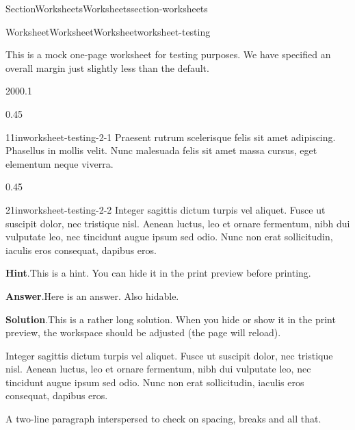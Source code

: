 \documentclass[oneside,10pt,]{article}
\newcommand{\blocktitlefont}{\relax}
\numberwithin{equation}{section}
\begin{document}
\begin{sectionptx}{Section}{Worksheets}{}{Worksheets}{}{}{section-worksheets}
%
\begin{worksheet-subsection}{Worksheet}{Worksheet}{}{Worksheet}{}{}{worksheet-testing}
\begin{introduction}{}%
This is a mock one-page worksheet for testing purposes. We have specified an overall margin just slightly less than the default.%
\end{introduction}%
\begin{sidebyside}{2}{0}{0}{0.1}%
\begin{sbspanel}{0.45}%
\begin{divisionexercise}{1}{}{1in}{worksheet-testing-2-1}%
Praesent rutrum scelerisque felis sit amet adipiscing. Phasellus in mollis velit. Nunc malesuada felis sit amet massa cursus, eget elementum neque viverra.%
\end{divisionexercise}%
\end{sbspanel}%
\begin{sbspanel}{0.45}%
\begin{divisionexercise}{2}{}{1in}{worksheet-testing-2-2}%
Integer sagittis dictum turpis vel aliquet. Fusce ut suscipit dolor, nec tristique nisl. Aenean luctus, leo et ornare fermentum, nibh dui vulputate leo, nec tincidunt augue ipsum sed odio. Nunc non erat sollicitudin, iaculis eros consequat, dapibus eros.%
\par\smallskip%
\noindent\textbf{\blocktitlefont Hint}.\hypertarget{worksheet-testing-2-2-2}{}\quad{}This is a hint.  You can hide it in the print preview before printing.%
\par\smallskip%
\noindent\textbf{\blocktitlefont Answer}.\hypertarget{worksheet-testing-2-2-3}{}\quad{}Here is an answer.  Also hidable.%
\par\smallskip%
\noindent\textbf{\blocktitlefont Solution}.\hypertarget{worksheet-testing-2-2-4}{}\quad{}This is a rather long solution.  When you hide or show it in the print preview, the workspace should be adjusted (the page will reload).%
\par
Integer sagittis dictum turpis vel aliquet. Fusce ut suscipit dolor, nec tristique nisl. Aenean luctus, leo et ornare fermentum, nibh dui vulputate leo, nec tincidunt augue ipsum sed odio. Nunc non erat sollicitudin, iaculis eros consequat, dapibus eros.%
\end{divisionexercise}%
\end{sbspanel}%
\end{sidebyside}%
\par
A two-line paragraph interspersed to check on spacing, breaks and all that.%

\end{worksheet-subsection}
\end{sectionptx}
\end{document}
